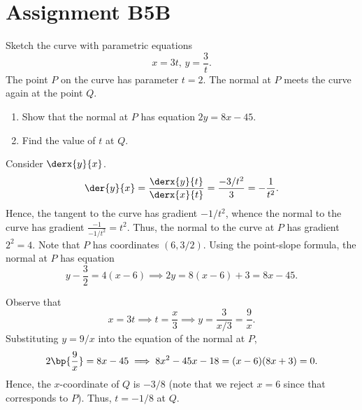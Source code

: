 \section{Assignment B5B}

\begin{problem}
    Sketch the curve with parametric equations \[x = 3t, \, y = \frac3t.\] The point $P$ on the curve has parameter $t = 2$. The normal at $P$ meets the curve again at the point $Q$.

    \begin{enumerate}
        \item Show that the normal at $P$ has equation $2y = 8x - 45$.
        \item Find the value of $t$ at $Q$.
    \end{enumerate}
\end{problem}
\begin{solution}
    \begin{center}
    \end{center}

    \begin{ppart}
        Consider $\derx{y}{x}$. \[\der{y}{x} = \frac{\derx{y}{t}}{\derx{x}{t}} = \frac{-3/t^2}{3} = -\frac1{t^2}.\] Hence, the tangent to the curve has gradient $-1/t^2$, whence the normal to the curve has gradient $\frac{-1}{-1/t^2} = t^2$. Thus, the normal to the curve at $P$ has gradient $2^2 = 4$. Note that $P$ has coordinates $(6, 3/2)$. Using the point-slope formula, the normal at $P$ has equation \[y - \frac32 = 4(x - 6) \implies 2y = 8(x-6) + 3 = 8x - 45.\]
    \end{ppart}
    \begin{ppart}
        Observe that \[x = 3t \implies t = \frac{x}3 \implies y = \frac3{x/3} = \frac9x.\] Substituting $y = 9/x$ into the equation of the normal at $P$, \[2\bp{\frac9x} = 8x - 45 \implies 8x^2 - 45x - 18 = (x-6)(8x+3) = 0.\] Hence, the $x$-coordinate of $Q$ is $-3/8$ (note that we reject $x = 6$ since that corresponds to $P$). Thus, $t = -1/8$ at $Q$.
    \end{ppart}
\end{solution}

